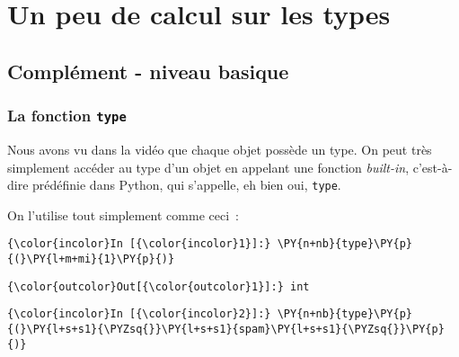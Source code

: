     
    
    
    

    

    \hypertarget{un-peu-de-calcul-sur-les-types}{%
\section{Un peu de calcul sur les
types}\label{un-peu-de-calcul-sur-les-types}}

    \hypertarget{compluxe9ment---niveau-basique}{%
\subsection{Complément - niveau
basique}\label{compluxe9ment---niveau-basique}}

    \hypertarget{la-fonction-type}{%
\subsubsection{\texorpdfstring{La fonction
\texttt{type}}{La fonction type}}\label{la-fonction-type}}

    Nous avons vu dans la vidéo que chaque objet possède un type. On peut
très simplement accéder au type d'un objet en appelant une fonction
\emph{built-in}, c'est-à-dire prédéfinie dans Python, qui s'appelle, eh
bien oui, \texttt{type}.

    On l'utilise tout simplement comme ceci~:

    \begin{Verbatim}[commandchars=\\\{\},frame=single,framerule=0.3mm,rulecolor=\color{cellframecolor}]
{\color{incolor}In [{\color{incolor}1}]:} \PY{n+nb}{type}\PY{p}{(}\PY{l+m+mi}{1}\PY{p}{)}
\end{Verbatim}


\begin{Verbatim}[commandchars=\\\{\},frame=single,framerule=0.3mm,rulecolor=\color{cellframecolor}]
{\color{outcolor}Out[{\color{outcolor}1}]:} int
\end{Verbatim}
            
    \begin{Verbatim}[commandchars=\\\{\},frame=single,framerule=0.3mm,rulecolor=\color{cellframecolor}]
{\color{incolor}In [{\color{incolor}2}]:} \PY{n+nb}{type}\PY{p}{(}\PY{l+s+s1}{\PYZsq{}}\PY{l+s+s1}{spam}\PY{l+s+s1}{\PYZsq{}}\PY{p}{)}
\end{Verbatim}


